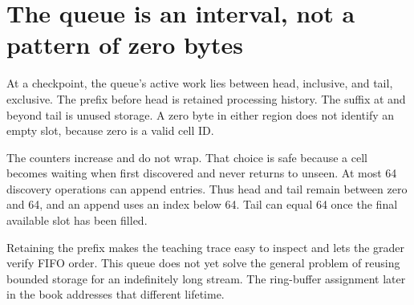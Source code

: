 \section{The queue is an interval, not a pattern of zero bytes}\label{maze-p05}

At a checkpoint, the queue's active work lies between head, inclusive, and tail, exclusive. The prefix before head is retained processing history. The suffix at and beyond tail is unused storage. A zero byte in either region does not identify an empty slot, because zero is a valid cell ID.

The counters increase and do not wrap. That choice is safe because a cell becomes waiting when first discovered and never returns to unseen. At most 64 discovery operations can append entries. Thus head and tail remain between zero and 64, and an append uses an index below 64. Tail can equal 64 once the final available slot has been filled.

Retaining the prefix makes the teaching trace easy to inspect and lets the grader verify FIFO order. This queue does not yet solve the general problem of reusing bounded storage for an indefinitely long stream. The ring-buffer assignment later in the book addresses that different lifetime.

